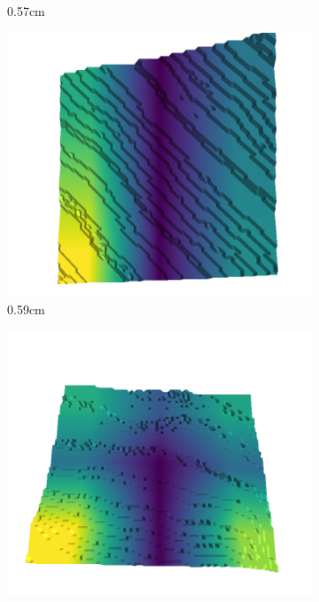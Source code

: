 \begin{figure}[H]
\begin{subfigure}[b]{0.192\linewidth}
    \caption{0.57cm}
    \label{fig : quarry-best-12}
    \end{subfigure}
    \begin{subfigure}[b]{0.192\linewidth}
    \includegraphics[width=\linewidth]{../img/5/quarry/best/58-patch-3d-majavi-colormap-120.png}
    \caption{0.59cm}
    \label{fig : quarry-best-13}
    \end{subfigure}
    \begin{subfigure}[b]{0.192\linewidth}
    \includegraphics[width=\linewidth]{../img/5/quarry/best/60-patch-3d-majavi-colormap-130.png}

\end{subfigure}
\end{figure}
